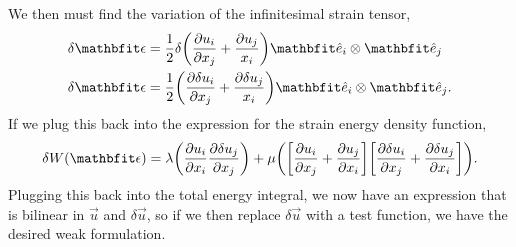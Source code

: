 We then must find the variation of the infinitesimal strain tensor,
\begin{align}
    \delta \vec{\epsilon} &= \frac{1}{2} \delta \mleft( \frac{\partial u_{i}}{\partial x_{j}} + \frac{\partial u_{j}}{x_{i}} \mright) \unitvec_{i} \otimes \unitvec_{j} \nonumber\\
    \delta \vec{\epsilon} &= \frac{1}{2} \mleft( \frac{\partial \delta u_{i}}{\partial x_{j}} + \frac{\partial \delta u_{j}}{x_{i}} \mright) \unitvec_{i} \otimes \unitvec_{j}.
\end{align}
If we plug this back into the expression for the strain energy density function,
\begin{equation}
    \delta W(\vec{\epsilon}) = \lambda \mleft( \frac{\partial u_{i}}{\partial x_{i}} \frac{\partial \delta u_{j}}{\partial x_{j}} \mright) + \mu \mleft( \mleft[ \frac{\partial u_{i}}{\partial x_{j}} + \frac{\partial u_{j}}{\partial x_{i}} \mright] \mleft[ \frac{\partial \delta u_{i}}{\partial x_{j}} + \frac{\partial \delta u_{j}}{\partial x_{i}} \mright] \mright).
\end{equation}
Plugging this back into the total energy integral, we now have an expression that is bilinear in $\vec{u}$ and $\delta \vec{u}$, so if we then replace $\delta \vec{u}$ with a test function, we have the desired weak formulation.

